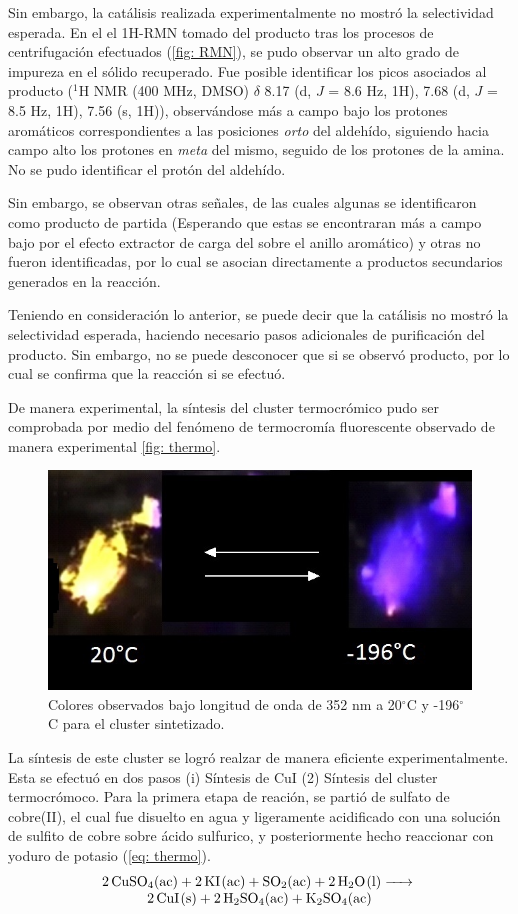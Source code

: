 \documentclass[fleqn,10pt]{SelfArx}
\begin{document}
Sin embargo, la catálisis realizada experimentalmente no mostró la selectividad esperada. En el el 1H-RMN tomado del producto tras los procesos de centrifugación efectuados (\autoref{fig: RMN}), se pudo observar un alto grado de impureza en el sólido recuperado. Fue posible identificar los picos asociados al producto ($^1$H NMR (400 MHz, DMSO) $\delta$ 8.17 (d, $J$ = 8.6 Hz, 1H), 7.68 (d, $J$ = 8.5 Hz, 1H), 7.56 (s, 1H)), observándose más a campo bajo los protones aromáticos correspondientes a las posiciones \textit{orto} del aldeh\'ido, siguiendo hacia campo alto los protones en \textit{meta} del mismo, seguido de los protones de la amina. No se pudo identificar el protón del aldehído.

Sin embargo, se observan otras señales, de las cuales algunas se identificaron como producto de partida (Esperando que estas se encontraran más a campo bajo por el efecto extractor de carga del  sobre el anillo aromático) y otras no fueron identificadas, por lo cual se asocian directamente a productos secundarios generados en la reacción.

Teniendo en consideración lo anterior, se puede decir que la catálisis no mostró la selectividad esperada, haciendo necesario pasos adicionales de purificación del producto. Sin embargo, no se puede desconocer que si se observó producto, por lo cual se confirma que la reacción si se efectuó. 

De manera experimental, la síntesis del cluster termocrómico  pudo ser comprobada por medio del fenómeno de termocromía fluorescente observado de manera experimental \autoref{fig: thermo}.
\begin{figure}[h]
	\centering
	\includegraphics[width=0.7\linewidth]{Structures/thermo.jpg}
	\caption{Colores observados bajo longitud de onda de 352 nm a 20$^\circ$C y -196$^\circ$C para el cluster sintetizado.}
	\label{fig: thermo}
\end{figure} 

\pagebreak
La síntesis de este cluster se logró realzar de manera eficiente experimentalmente. Esta se efectuó en dos pasos (i) Síntesis de CuI (2) Síntesis del cluster termocrómoco. 
Para la primera etapa de reación, se partió de sulfato de cobre(II), el cual fue disuelto en agua y ligeramente acidificado con una solución de sulfito de cobre sobre ácido sulfurico, y posteriormente  hecho reaccionar con yoduro de potasio (\autoref{eq: thermo}).
\begin{equation}\label{eq: thermo}
	\begin{matrix}
		\ce{2CuSO4(ac) + 2KI(ac) + SO2(ac) + 2H2O(l) ->} \\
		\ce{2CuI(s) + 2H2SO4(ac) + K2SO4(ac)}
	\end{matrix}
\end{equation}
\end{document}
